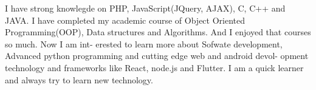 \documentclass[a4paper,12pt]{article}
\begin{document}

I have strong knowlegde on PHP, JavaScript(JQuery, AJAX), C, C++ and JAVA. I have completed my academic course of Object Oriented Programming(OOP), Data structures and Algorithms. And I enjoyed that courses so much. Now I am int- erested to learn more about Sofwate development, Advanced python programming and cutting edge web and android devol- opment technology and frameworks like React, node.js and Flutter. I am a quick learner and always try to learn new technology.
\end{document}
